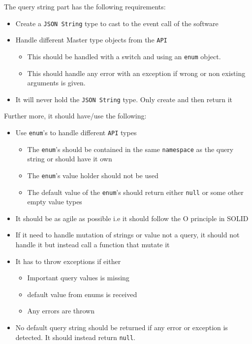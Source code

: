 \documentclass[10pt, a4paper]{memoir}
\numberwithin{equation}{section}
\theoremstyle{plain}
\theoremstyle{defp}
\theoremstyle{dotless}
\theoremstyle{definition}
\theoremstyle{dotless}
\theoremstyle{dotless}
\theoremstyle{defp}
\theoremstyle{defp}
\theoremstyle{be}          %
\theoremstyle{defp}
\newcommand\ttt[1]{\texttt{#1}}
\newcommand\tsc[1]{\textsc{#1}}
\begin{document}
The query string part has the following requirements:

\begin{itemize}[noitemsep,topsep=1pt]
\item Create a \ttt{JSON String} type to cast to the event call of the software
\item Handle different Master type objects from the \ttt{API}
\begin{itemize}[noitemsep,topsep=1pt]
\item This should be handled with a switch and using an \ttt{enum} object.
\item This should handle any error with an exception if wrong or non existing arguments is given.
\end{itemize}
\item It will never hold the \ttt{JSON String} type. Only create and then return it
\end{itemize}

Further more, it should have/use the following:

\begin{itemize}[noitemsep,topsep=1pt]
\item Use \ttt{enum}'s to handle different \ttt{API} types
	\begin{itemize}[noitemsep,topsep=1pt]
	\item The \ttt{enum}'s should be contained in the same \ttt{namespace} as the query string or should have it own
	\item The \ttt{enum}'s value holder should not be used
	\item The default value of the \ttt{enum}'s should return either \ttt{null} or some other empty value types
	\end{itemize}
\item It should be as agile as possible i.e it should follow the \tsc{O} principle in \tsc{SOLID}
\item If it need to handle mutation of strings or value not a query, it should not handle it but instead call a function that mutate it
\item It has to throw exceptions if either
	\begin{itemize}[noitemsep,topsep=1pt]
	\item Important query values is missing
	\item default value from enums is received
	\item Any errors are thrown
	\end{itemize}
\item No default query string should be returned if any error or exception is detected. It should instead return \ttt{null}.
\end{itemize}
\end{document}
